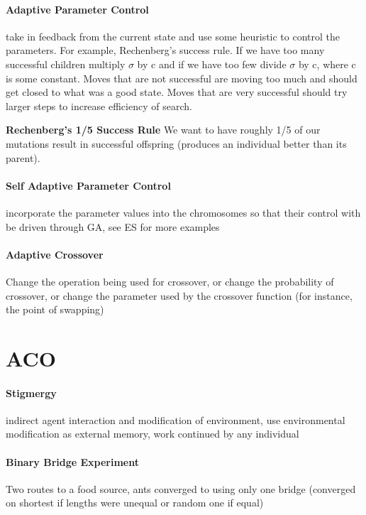 \documentclass[12pt]{article}
\begin{document}
\paragraph{Adaptive Parameter Control} 
take in feedback from the current state and use some heuristic to control the parameters. For example, Rechenberg's success rule. If we have too many successful children multiply $\sigma$ by c and if we have too few divide $\sigma$ by c, where c is some constant. Moves that are not successful are moving too much and should get closed to what was a good state. Moves that are very successful should try larger steps to increase efficiency of search.

\textbf{Rechenberg's 1/5 Success Rule} We want to have roughly 1/5 of our mutations result in successful offspring (produces an individual better than its parent). 

\paragraph{Self Adaptive Parameter Control} 
incorporate the parameter values into the chromosomes so that their control with be driven through GA, see ES for more examples

\paragraph{Adaptive Crossover} 
Change the operation being used for crossover, or change the probability of crossover, or change the parameter used by the crossover function (for instance, the point of swapping)

\section*{ACO}
\paragraph{Stigmergy} 
indirect agent interaction and modification of environment, use environmental modification as external memory, work continued by any individual

\paragraph{Binary Bridge Experiment} 
Two routes to a food source, ants converged to using only one bridge (converged on shortest if lengths were unequal or random one if equal) 
\end{document}
